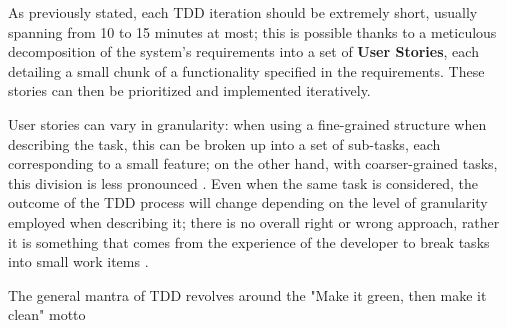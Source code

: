 As previously stated, each TDD iteration should be extremely short, usually spanning from 10 to 15 minutes at most; this is possible thanks to a meticulous decomposition of the system's requirements into a set of \textbf{User Stories}, each detailing a small chunk of a functionality specified in the requirements. These stories can then be prioritized and implemented iteratively.

User stories can vary in granularity: when using a fine-grained structure when describing the task, this can be broken up into a set of sub-tasks, each corresponding to a small feature; on the other hand, with coarser-grained tasks, this division is less pronounced \cite{DBLP:journals/tse/KaracTJ21}. Even when the same task is considered, the outcome of the TDD process will change depending on the level of granularity employed when describing it; there is no overall right or wrong approach, rather it is something that comes from the experience of the developer to break tasks into small work items \cite{DBLP:journals/tse/KaracTJ21}.

The general mantra of TDD revolves around the "Make it green, then make it clean" motto

